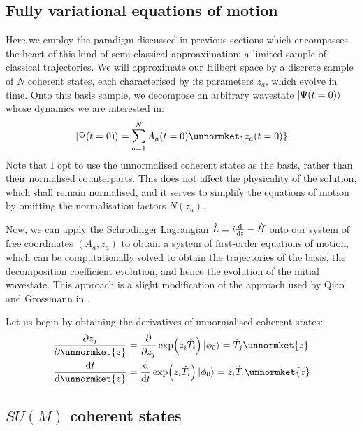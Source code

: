 \subsection{Fully variational equations of motion}
Here we employ the paradigm discussed in previous sections which encompasses the heart of this kind of semi-classical approaximation: a limited sample of classical trajectories. We will approximate our Hilbert space by a discrete sample of $N$ coherent states, each characterised by its parameters $z_a$, which evolve in time. Onto this basis sample, we decompose an arbitrary wavestate $\ket{\Psi(t=0)}$ whose dynamics we are interested in:
\begin{equation}
\ket{\Psi(t=0)}=\sum_{a=1}^N A_a(t=0)\unnormket{z_a(t=0)}
\end{equation}
Note that I opt to use the unnormalised coherent states as the basis, rather than their normalised counterparts. This does not affect the physicality of the solution, which shall remain normalised, and it serves to simplify the equations of motion by omitting the normalisation factors $N(z_a)$.

Now, we can apply the Schrodinger Lagrangian $\hat{L}=i\dv{t}-\hat{H}$ onto our system of free coordinates $(A_a, z_a)$ to obtain a system of first-order equations of motion, which can be computationally solved to obtain the trajectories of the basis, the decomposition coefficient evolution, and hence the evolution of the initial wavestate. This approach is a slight modification of the approach used by Qiao and Grossmann in \cite{grossmann}.

Let us begin by obtaining the derivatives of unnormalised coherent states:
\begin{align}
\pdv{z_j}\unnormket{z}&=\pdv{z_j}\exp(z_i\hat{T}_i)\ket{\phi_0}=\hat{T}_j\unnormket{z}\\
\dv{t}\unnormket{z}&=\dv{t}\exp(z_i\hat{T}_i)\ket{\phi_0}=\dot{z}_i\hat{T}_i\unnormket{z}
\end{align}


\subsection{$SU(M)$ coherent states}